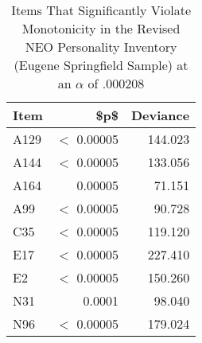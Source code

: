 \begin{table}[ht]
\centering
\caption{Items That Significantly Violate Monotonicity in the Revised NEO Personality Inventory (Eugene Springfield Sample) at an $\alpha$ of .000208} 
\label{tab:neo_pi_r}
\begin{tabular}{lrr}
  \toprule
Item & \$p\$ & Deviance \\ 
  \midrule
A129 & $<$ 0.00005 & 144.023 \\ 
  A144 & $<$ 0.00005 & 133.056 \\ 
  A164 & 0.00005 & 71.151 \\ 
  A99 & $<$ 0.00005 & 90.728 \\ 
  C35 & $<$ 0.00005 & 119.120 \\ 
  E17 & $<$ 0.00005 & 227.410 \\ 
  E2 & $<$ 0.00005 & 150.260 \\ 
  N31 & 0.0001 & 98.040 \\ 
  N96 & $<$ 0.00005 & 179.024 \\ 
   \bottomrule
\end{tabular}
\end{table}
